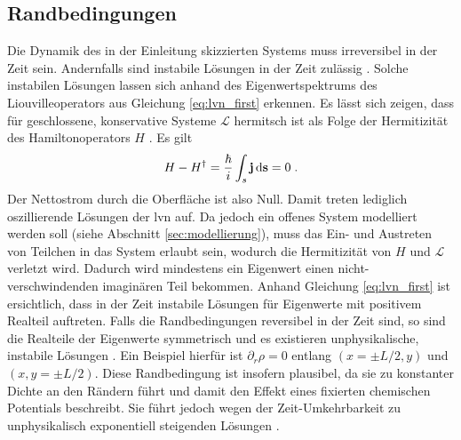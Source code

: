 \subsection{Randbedingungen}
\label{sec:RB}
Die Dynamik des in der Einleitung skizzierten Systems muss irreversibel in der Zeit sein. Andernfalls sind instabile Lösungen in der Zeit zulässig \cite{frensley2}. Solche instabilen Lösungen lassen sich anhand des Eigenwertspektrums des Liouvilleoperators aus Gleichung \eqref{eq:lvn_first} erkennen. Es lässt sich zeigen, dass für geschlossene, konservative Systeme $\mathcal{L}$ hermitsch ist als Folge der Hermitizität des Hamiltonoperators $H$ \cite{frensley2}. Es gilt
\begin{align}
  H- H^{\dagger} = \frac{\hbar}{i}\int_s \vb{j}\mathop{}\!\mathrm{d}\vb{s} = 0 \; .
\end{align}
Der Nettostrom durch die Oberfläche ist also Null. Damit treten lediglich oszillierende Lösungen der \ac{lvn} auf. Da jedoch ein offenes System modelliert werden soll (siehe Abschnitt \ref{sec:modellierung}), muss das Ein- und Austreten von Teilchen in das System erlaubt sein, wodurch die Hermitizität von $H$ und $\mathcal{L}$ verletzt wird. Dadurch wird mindestens ein Eigenwert einen nicht-verschwindenden imaginären Teil bekommen. Anhand Gleichung \eqref{eq:lvn_first} ist ersichtlich, dass in der Zeit instabile Lösungen für Eigenwerte mit positivem Realteil auftreten. Falls die Randbedingungen reversibel in der Zeit sind, so sind die Realteile der Eigenwerte symmetrisch und es existieren unphysikalische, instabile Lösungen \cite{frensley2}. Ein Beispiel hierfür ist $\partial_r \rho = 0$ entlang $(x=\pm L/2, y)$ und $(x,y=\pm L/2)$. Diese Randbedingung ist insofern plausibel, da sie zu konstanter Dichte an den Rändern führt und damit den Effekt eines fixierten chemischen Potentials beschreibt. Sie führt jedoch wegen der Zeit-Umkehrbarkeit zu unphysikalisch exponentiell steigenden Lösungen \cite{frensley2}.

